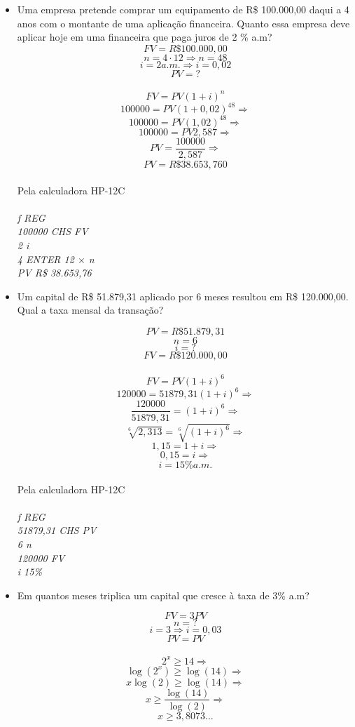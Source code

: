 \documentclass[a4paper, 12pt]{article}
\begin{document}
\begin{itemize}

\item Uma empresa pretende comprar um equipamento de R\$ 100.000,00 daqui
a 4 anos com o montante de uma aplicação financeira. Quanto essa empresa
deve aplicar hoje em uma financeira que paga juros de 2 \% a.m?
$$ FV = R\$100.000,00 $$
$$ n = 4 \cdot 12 \Rightarrow n = 48 $$
$$ i = 2 a.m. \Rightarrow i = 0,02 $$
$$ PV = ? $$
\\
$$ FV = PV(1+i)^n $$
$$ 100000 = PV(1+0,02)^{48} \Rightarrow $$
$$ 100000 = PV(1,02)^{48}  \Rightarrow $$
$$ 100000 = PV2,587  \Rightarrow $$
$$ PV = \frac{100000}{2,587}  \Rightarrow $$
$$ \boxed{PV = R\$38.653,760} $$
\\
Pela calculadora HP-12C\\\\
\emph{f REG}\\
\emph{100000 CHS FV}\\
\emph{2 i}\\
\emph{4 ENTER 12 $ \times$ n}\\
\emph{PV R\$ 38.653,76}

\item Um  capital  de  R\$  51.879,31  aplicado  por  6  meses  resultou  em  R\$ 120.000,00. Qual a taxa mensal da transação?
  
$$ PV = R\$51.879,31 $$
$$ n = 6 $$
$$ i = ? $$
$$ FV = R\$120.000,00 $$
\\
$$ FV = PV(1+i)^6 $$
$$ 120000 = 51879,31(1+i)^6 \Rightarrow $$
$$ \frac{120000}{51879,31} = (1+i)^6 \Rightarrow $$
$$ \sqrt[6]{2,313} = \sqrt[6]{(1+i)^6} \Rightarrow $$
$$ 1,15 = 1+i \Rightarrow $$
$$ 0,15 = i \Rightarrow $$
$$ \boxed{i = 15\% a.m.} $$
\\

Pela calculadora HP-12C\\\\
\emph{f REG}\\
\emph{51879,31 CHS PV}\\
\emph{6 n}\\
\emph{120000 FV}\\
\emph{i 15\%}
  
\item Em quantos meses triplica um capital que cresce à taxa de 3\% a.m?

$$ FV = 3PV $$
$$ n = ? $$
$$ i = 3 \Rightarrow i = 0,03 $$
$$ PV = PV $$
\\
$$ 2^{x} \geq 14 \Rightarrow $$
$$ \log(2^{x}) \geq \log(14) \Rightarrow $$
$$ x\log(2) \geq \log(14) \Rightarrow $$
$$ x \geq \frac{\log(14)}{\log(2)} \Rightarrow $$
$$ \boxed{x \geq 3,8073...} $$


\end{itemize}
\end{document}
